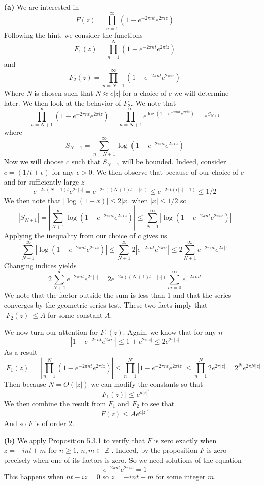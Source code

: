 \documentclass{article}
\DeclareMathOperator{\Z}{\mathbb{Z}}
\newcommand{\exercise}[1]{\noindent{\textbf{Exercise #1:}}}
\begin{document}
\exercise{5.6.4}
\begin{enumerate}
\item[\textbf{(a)}] We are interested in
\[
F(z) = \prod_{n=1}^\infty (1 - e^{-2\pi nt}e^{2\pi iz})
\]
Following the hint, we consider the functions
\[
F_1(z) = \prod_{n=1}^N (1 - e^{-2\pi nt}e^{2\pi iz})
\]
and
\[
F_2(z) = \prod_{n=N+1}^\infty (1 - e^{-2\pi nt}e^{2\pi iz})
\]
Where $N$ is chosen such that $N \approx c|z|$ for a choice of $c$ we
will determine later. We then look at the behavior of $F_2$. We note
that
\[
\prod_{n=N+1}^\infty (1 - e^{-2\pi nt}e^{2\pi iz}) =
\prod_{n=N+1}^\infty e^{\log{(1 - e^{-2\pi nt}e^{2\pi iz})}} = e^{S_{N+1}}
\]
where
\[
S_{N+1} = \sum_{n=N+1}^\infty \log{(1 - e^{-2\pi nt}e^{2\pi iz})}
\]
Now we will choose $c$ such that $S_{N+1}$ will be bounded. Indeed,
consider $c = (1/t + \epsilon)$ for any $\epsilon > 0$. We then
observe that because of our choice of $c$ and for sufficiently large
$z$
\[
e^{-2\pi(N+1)t}e^{2\pi|z|} = e^{-2\pi((N+1)t - |z|)} \leq e^{-2\pi
  t(\epsilon |z| + 1)} \leq 1/2
\]
We then note that $|\log (1+x)| \leq 2|x|$ when $|x| \leq 1/2$ so
\[
|S_{N+1}| = \left|\sum_{N+1}^\infty \log{(1 - e^{-2\pi nt}e^{2\pi
      iz})}\right| \leq \sum_{N+1}^\infty |\log{(1 - e^{-2\pi nt}e^{2\pi
      iz})}|
\]
Applying the inequality from our choice of $c$ gives us
\[
\sum_{N+1}^\infty |\log{(1 - e^{-2\pi nt}e^{2\pi iz})}| \leq
\sum_{N+1}^\infty 2|e^{-2\pi nt}e^{2\pi iz}| \leq 2\sum_{N+1}^\infty
e^{-2\pi nt}e^{2\pi |z|}
\]
Changing indices yields
\[
2\sum_{N+1}^\infty e^{-2\pi nt}e^{2\pi |z|} = 2e^{-2\pi((N+1)t -
  |z|)}\sum_{m=0}^\infty e^{-2\pi mt}
\]
We note that the factor outside the sum is less than 1 and that the
series converges by the geometric series test. These two facts imply
that $|F_2(z)| \leq A$ for some constant $A$.

We now turn our attention for $F_1(z)$. Again, we know that for any
$n$
\[
|1 - e^{-2\pi nt}e^{2\pi iz}| \leq 1 + e^{2\pi|z|} \leq 2e^{2\pi |z|}
\]
As a result
\[
|F_1(z)| = \left|\prod_{n=1}^{N} (1 - e^{-2\pi nt}e^{2\pi iz})\right|
\leq \prod_{n=1}^N |1 - e^{-2\pi nt}e^{2\pi iz}| \leq \prod_{n=1}^N
2e^{2\pi |z|} = 2^Ne^{2\pi N|z|}
\]
Then because $N = O(|z|)$ we can modify the constants so that
\[
|F_1(z)| \leq e^{a|z|^2}
\]
We then combine the result from $F_1$ and $F_2$ to see that
\[
F(z) \leq Ae^{a|z|^2}
\]
And so $F$ is of order 2.
\item[\textbf{(b)}] We apply Proposition 5.3.1 to verify that $F$ is
  zero exactly when $z = -int + m$ for $n\geq 1$, $n,m \in
  \Z$. Indeed, by the proposition $F$ is zero precisely when one of
  its factors is zero. So we need solutions of the equation
  \[
  e^{-2\pi nt}e^{2\pi iz} = 1
  \]
  This happens when $nt - iz = 0$ so $z = -int + m$ for some integer $m$.


\end{enumerate}
\end{document}
